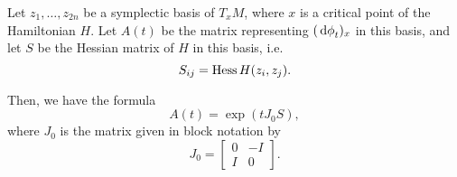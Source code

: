 \begin{theorem}\label{thm:dphimatrix}
Let $z_1, \dots, z_{2n}$ be a symplectic basis of $T_x M$, where $x$ is a critical point of the Hamiltonian $H$. Let $A(t)$ be the matrix representing $(\dl \phi_t)_x$ in this basis, and let $S$ be the Hessian matrix of $H$ in this basis, i.e.
\begin{equation}
S_{ij} = \operatorname{Hess} H(z_i, z_j).
\end{equation}

Then, we have the formula
\begin{equation}
A(t) = \exp(t J_0 S),
\end{equation}
where $J_0$ is the matrix given in block notation by
\begin{equation}
J_0 = \begin{bmatrix} 0 & -I \\ I & 0 \end{bmatrix}.
\end{equation}
\end{theorem}

